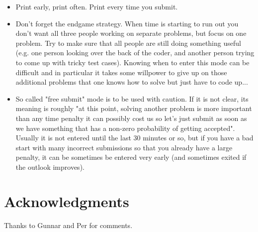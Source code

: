 \documentclass{article}
\begin{document}
\begin{itemize}
  \item Print early, print often. Print every time you submit.

  \item Don't forget the endgame strategy.  When time is starting to run out you
  don't want all three people working on separate problems, but focus on one
  problem.  Try to make sure that all people are still doing something useful
  (e.g. one person looking over the back of the coder, and another person trying
  to come up with tricky test cases). Knowing when to enter this mode can be
  difficult and in particular it takes some willpower to give up on those
  additional problems that one knows how to solve but just have to code up...

  \item So called "free submit" mode is to be used with caution. If it is
  not clear, its meaning is roughly "at this point, solving another problem is
  more important than any time penalty it can possibly cost us so let's just
  submit as soon as we have something that has a non-zero probability of getting
  accepted". Usually it is not entered until the last 30 minutes or so, but if
  you have a bad start with many incorrect submissions so that you already have
  a large penalty, it can be sometimes be entered very early (and sometimes
  exited if the outlook improves).
\end{itemize}


\section*{Acknowledgments}
Thanks to Gunnar and Per for comments.
\end{document}
